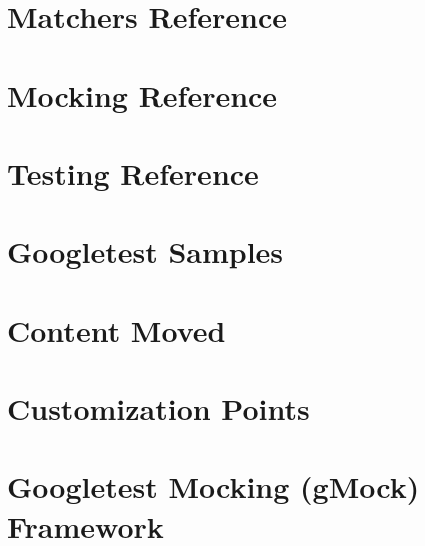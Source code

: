 \let\mypdfximage\pdfximage\def\pdfximage{\immediate\mypdfximage}\documentclass[twoside]{book}
\newcommand{\+}{\discretionary{\mbox{\scriptsize$\hookleftarrow$}}{}{}}
\begin{document}
\chapter{Matchers Reference}
\label{md_04_cmake_build_debug__deps_googletest_src_docs_reference_matchers}

\chapter{Mocking Reference}
\label{md_04_cmake_build_debug__deps_googletest_src_docs_reference_mocking}

\chapter{Testing Reference}
\label{md_04_cmake_build_debug__deps_googletest_src_docs_reference_testing}

\chapter{Googletest Samples}
\label{md_04_cmake_build_debug__deps_googletest_src_docs_samples}

\chapter{Content Moved}
\label{md_04_cmake_build_debug__deps_googletest_src_googlemock_docs_README}

\chapter{Customization Points}
\label{md_04_cmake_build_debug__deps_googletest_src_googlemock_include_gmock_internal_custom_README}

\chapter{Googletest Mocking (g\+Mock) Framework}
\label{md_04_cmake_build_debug__deps_googletest_src_googlemock_README}

\end{document}
